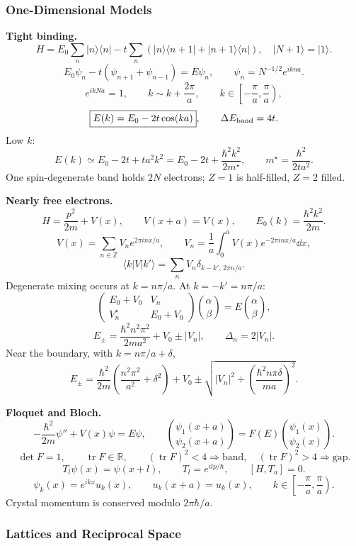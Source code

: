 \subsubsection*{One-Dimensional Models}

\noindent\textbf{Tight binding.}
\[
H=E_0\sum_n|n\rangle\langle n|
-t\sum_n(|n\rangle\langle n+1|+|n+1\rangle\langle n|),
\quad |N+1\rangle=|1\rangle.
\]
\[
E_0\psi_n-t(\psi_{n+1}+\psi_{n-1})=E\psi_n,\qquad
\psi_n=N^{-1/2}e^{ikna}.
\]
\[
e^{ikNa}=1,\qquad
k\sim k+\frac{2\pi}{a},\qquad
k\in\left[-\frac{\pi}{a},\frac{\pi}{a}\right),
\]
\[
\boxed{E(k)=E_0-2t\cos(ka)},\qquad \Delta E_{\rm band}=4t.
\]
Low $k$:
\[
E(k)\simeq E_0-2t+ta^2k^2
=E_0-2t+\frac{\hbar^2k^2}{2m^\star},\qquad
\boxed{m^\star=\frac{\hbar^2}{2ta^2}}.
\]
One spin-degenerate band holds $2N$ electrons; $Z=1$ is half-filled, $Z=2$ filled.

\noindent\textbf{Nearly free electrons.}
\[
H=\frac{p^2}{2m}+V(x),\qquad V(x+a)=V(x),\qquad
E_0(k)=\frac{\hbar^2k^2}{2m}.
\]
\[
V(x)=\sum_{n\in\mathbb Z}V_ne^{2\pi inx/a},\qquad
V_n=\frac1a\int_0^aV(x)e^{-2\pi inx/a}\dd x,
\]
\[
\boxed{\langle k|V|k'\rangle
=\sum_nV_n\delta_{k-k',\,2\pi n/a}}.
\]
Degenerate mixing occurs at $k=n\pi/a$. At $k=-k'=n\pi/a$:
\[
\begin{pmatrix}E_0+V_0&V_n\\V_n^\star&E_0+V_0\end{pmatrix}
\binom{\alpha}{\beta}=E\binom{\alpha}{\beta},
\]
\[
\boxed{E_\pm=\frac{\hbar^2n^2\pi^2}{2ma^2}+V_0\pm |V_n|},\qquad
\boxed{\Delta_n=2|V_n|}.
\]
Near the boundary, with $k=n\pi/a+\delta$,
\[
E_\pm=\frac{\hbar^2}{2m}\left(\frac{n^2\pi^2}{a^2}+\delta^2\right)+V_0
\pm\sqrt{|V_n|^2+\left(\frac{\hbar^2n\pi\delta}{ma}\right)^2}.
\]

\noindent\textbf{Floquet and Bloch.}
\[
-\frac{\hbar^2}{2m}\psi''+V(x)\psi=E\psi,\qquad
\binom{\psi_1(x+a)}{\psi_2(x+a)}=F(E)\binom{\psi_1(x)}{\psi_2(x)}.
\]
\[
\det F=1,\qquad \operatorname{tr}F\in\mathbb R,\qquad
(\operatorname{tr}F)^2<4\Rightarrow\text{band},\quad
(\operatorname{tr}F)^2>4\Rightarrow\text{gap}.
\]
\[
T_l\psi(x)=\psi(x+l),\qquad T_l=e^{ilp/\hbar},\qquad [H,T_a]=0.
\]
\[
\boxed{\psi_k(x)=e^{ikx}u_k(x)},\qquad
u_k(x+a)=u_k(x),\qquad
k\in\left[-\frac{\pi}{a},\frac{\pi}{a}\right).
\]
Crystal momentum is conserved modulo $2\pi\hbar/a$. 

\subsubsection*{Lattices and Reciprocal Space}

